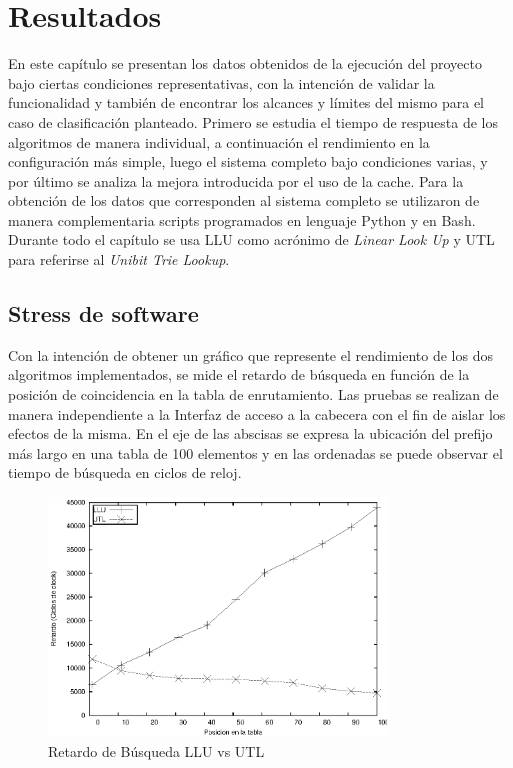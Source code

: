 \chapter{Resultados}

En este capítulo se presentan los datos obtenidos de la ejecución del proyecto bajo ciertas condiciones representativas, con la intención de validar la funcionalidad y también de encontrar los alcances y límites del mismo para el caso de clasificación planteado. Primero se estudia el tiempo de respuesta de los algoritmos de manera individual, a continuación el rendimiento en la configuración más simple, luego el sistema completo bajo condiciones varias, y por último se analiza la mejora introducida por el uso de la cache. Para la obtención de los datos que corresponden al sistema completo se utilizaron de manera complementaria scripts programados en lenguaje Python y en Bash. Durante todo el capítulo se usa LLU como acrónimo de \textit{Linear Look Up} y UTL para referirse al \textit{Unibit Trie Lookup}. 


\section{Stress de software}

Con la intención de obtener un gráfico que represente el rendimiento de los dos algoritmos implementados, se mide el retardo de búsqueda en función de la posición de coincidencia en la tabla de enrutamiento. Las pruebas se realizan de manera independiente a la Interfaz de acceso a la cabecera con el fin de aislar los efectos de la misma. En el eje de las abscisas se expresa la ubicación del prefijo más largo en una tabla de 100 elementos  y en las ordenadas se puede observar el tiempo de búsqueda en ciclos de reloj.

\begin{figure}[h]
  \centering
	\includegraphics[width=0.8\textwidth]{5-resultados/graf/llu-utlsof.eps}
  \caption{Retardo de Búsqueda LLU vs UTL}
  \label{fig}
\end{figure}

